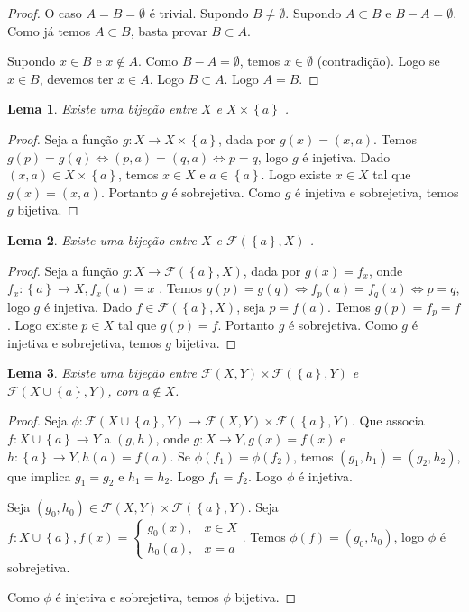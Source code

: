 \documentclass{article}
\theoremstyle{plain}
\newtheorem{lema}{Lema}
\theoremstyle{definition}
\theoremstyle{remark}
\begin{document}
\begin{proof}
	O caso $A = B  = \emptyset $ é trivial. Supondo $B \neq \emptyset$.
	Supondo $A\subset B$ e $B-A = \emptyset$. Como já temos $A\subset B$, basta provar $B \subset A$. 

	Supondo $x\in B$ e $x\not \in A$. Como $B-A = \emptyset$, temos $x\in \emptyset$ (contradição). Logo se $x\in B$, devemos ter $x\in A$. Logo $B \subset A$. Logo $A = B$.
\end{proof}
\begin{lema}
	Existe uma bijeção entre $X$ e  $X \times \left\{ a\right\}$ .
\end{lema}
\begin{proof}
	Seja a função $g: X  \to  X \times \left\{a\right\}$, dada por $g(x) = (x,a)$. Temos $g(p) = g(q) \iff (p,a) = (q,a) \iff p = q $, logo $g$ é injetiva. Dado $(x,a) \in X \times \left\{ a\right\}$, temos $x\in X$ e $a\in \left\{a\right\}$. Logo existe $x\in X$ tal que $g(x) = (x,a) $. Portanto $g$ é sobrejetiva. Como $g$ é injetiva e sobrejetiva, temos  $g$  bijetiva.
\end{proof}
\begin{lema}
	Existe uma bijeção entre $X$ e  $\mathcal{F}(\left\{a\right\}, X )$ .
\end{lema}
\begin{proof}
	Seja a função $g: X  \to  \mathcal{F}( \left\{a\right\}, X )$, dada por $g(x) = f_x$, onde $f_x: \left\{ a\right\} \to X, f_x(a) = x$ . Temos $g(p) = g(q) \iff f_p(a) = f_q(a) \iff p = q $, logo $g$ é injetiva. Dado $f \in \mathcal{F}( \left\{ a\right\}, X)$, seja $p = f(a)$. Temos $g(p) = f_p = f$. Logo existe $p\in X$ tal que $g(p) = f $. Portanto $g$ é sobrejetiva. Como $g$ é injetiva e sobrejetiva, temos  $g$  bijetiva.
\end{proof}
\begin{lema}
	Existe uma bijeção entre $\mathcal{F}(X  , Y )\times \mathcal{F}( \left\{ a \right\} , Y ) $ e  $\mathcal{F}(X \cup \left\{ a \right\} , Y )$, com $a\not \in X$.
\end{lema}
\begin{proof}
	Seja $\phi: \mathcal{F}(X \cup \left\{ a \right\} , Y ) \to \mathcal{F}(X  , Y )\times \mathcal{F}( \left\{ a \right\} , Y ) $. Que associa $f: X\cup \left\{a\right\} \to Y$ a $(g,h)$, onde $g: X\to Y, g(x) = f(x)$ e $h: \left\{a\right\} \to Y, h(a) = f(a)$. Se $\phi(f_1) = \phi(f_2)$, temos $(g_1, h_1) = (g_2, h_2)$, que implica $g_1 = g_2$ e $h_1 = h_2$. Logo $f_1 = f_2$. Logo $\phi$ é injetiva. 

	Seja $(g_0,h_0) \in \mathcal{F}(X  , Y )\times \mathcal{F}( \left\{ a \right\} , Y ) $. Seja $f: X\cup \left\{a\right\}, f(x) = \begin{cases} g_0(x), & x\in X \\ h_0(a), &x= a \end{cases}$. Temos $\phi(f)  = (g_0,h_0)$, logo $\phi$ é sobrejetiva.

		Como $\phi$ é injetiva e sobrejetiva, temos $\phi$ bijetiva.
\end{proof}
\end{document}
